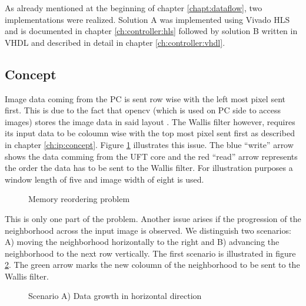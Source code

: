 As already mentioned at the beginning of chapter \ref{chapt:dataflow}, two
implementations were realized. Solution A was implemented using Vivado HLS and
is documented in chapter \ref{ch:controller:hls} followed by solution B written
in VHDL and described in detail in chapter \ref{ch:controller:vhdl}. 

\subsection{Concept} \label{ch:control:concept}
Image data coming from the PC is sent row wise with the left most pixel sent
first. This is due to the fact that \gls{opencv} (which is used on PC
side to access
images) stores the image data in said layout \cite{opencv_structures}. The
Wallis filter however, requires its input data to be coloumn wise with the top
most pixel sent first as described in chapter \ref{ch:ip:concept}. Figure 
\ref{fig:memproblem} illustrates this issue. The blue ``write'' arrow shows the data
comming from the UFT core and the red ``read'' arrow represents the order the
data has to be sent to the Wallis filter. For illustration purposes a window
length of five and image width of eight is used.

\begin{figure}[h!]
    \centering
    \begin{adjustbox}{scale=0.7}
        
    \end{adjustbox}
    \caption{Memory reordering problem}
    \label{fig:memproblem}
\end{figure}
\clearpage
This is only one part of the problem. Another issue arises if the
progression of the neighborhood across the input image is observed. We
distinguish two scenarios: A) moving the neighborhood horizontally to the right
and B) advancing the neighborhood to the next row vertically. The first
scenario is illustrated in figure \ref{fig:memproblemgrowthx}. The green arrow
marks the new coloumn of the neighborhood to be sent to the Wallis filter.

\begin{figure}[t!]
    \centering
    \begin{adjustbox}{scale=0.7}
        
    \end{adjustbox}
    \caption{Scenario A) Data growth in horizontal direction}
    \label{fig:memproblemgrowthx}
\end{figure}

